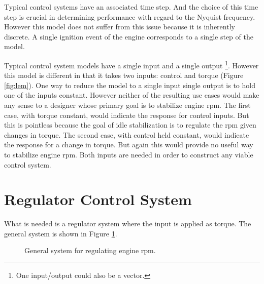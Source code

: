 \documentclass{article}
\begin{document}
Typical control systems have an associated time step.
And the choice of this time step is crucial in determining performance
with regard to the Nyquist frequency.
However this model does not suffer from this issue because it is
inherently discrete.
A single ignition event of the engine corresponds to a single
step of the model.


Typical control system models have a single input and a single output
\footnote{One input/output could also be a vector.}.
However this model is different in that it takes
two inputs: control and torque (Figure \ref{fig:lem}).
One way to reduce the model to a single input single output is to hold
one of the inputs constant.
However neither of the resulting use cases would make any sense to
a designer whose primary goal is to stabilize engine rpm.
The first case, with torque constant, would indicate the response for
control inputs.
But this is pointless because the goal of idle stabilization is to
regulate the rpm given changes in torque.
The second case, with control held constant, would indicate the response
for a change in torque.
But again this would provide no useful way to stabilize engine rpm.
Both inputs are needed in order to construct any viable control system.

\section{Regulator Control System}

What is needed is a regulator system where the input is applied
as torque.
The general system is shown in Figure \ref{fig:rpm1}.

\begin{figure}[hbp!]
\begin{center}


\end{center}
\caption{General system for regulating engine rpm.}\label{fig:rpm1}
\end{figure}
\end{document}
